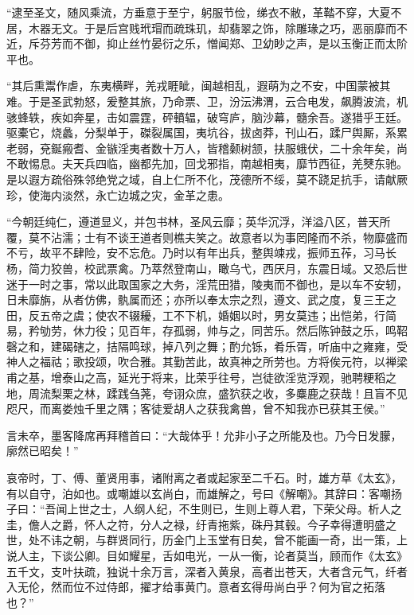 \documentclass[12pt,UTF8]{ctexbook}
\begin{document}
“逮至圣文，随风乘流，方垂意于至宁，躬服节俭，绨衣不敝，革鞜不穿，大夏不居，木器无文。于是后宫贱玳瑁而疏珠玑，却翡翠之饰，除雕瑑之巧，恶丽靡而不近，斥芬芳而不御，抑止丝竹晏衍之乐，憎闻郑、卫幼眇之声，是以玉衡正而太阶平也。



“其后熏鬻作虐，东夷横畔，羌戎睚眦，闽越相乱，遐萌为之不安，中国蒙被其难。于是圣武勃怒，爰整其旅，乃命票、卫，汾沄沸渭，云合电发，飙腾波流，机骇蜂轶，疾如奔星，击如震霆，砰轒辒，破穹庐，脑沙幕，髓余吾。遂猎乎王廷。驱橐它，烧蠡，分梨单于，磔裂属国，夷坑谷，拔卤莽，刊山石，蹂尸舆厮，系累老弱，兗鋋瘢耆、金镞淫夷者数十万人，皆稽颡树颔，扶服蛾伏，二十余年矣，尚不敢惕息。夫天兵四临，幽都先加，回戈邪指，南越相夷，靡节西征，羌僰东驰。是以遐方疏俗殊邻绝党之域，自上仁所不化，茂德所不绥，莫不跷足抗手，请献厥珍，使海内淡然，永亡边城之灾，金革之患。



“今朝廷纯仁，遵道显义，并包书林，圣风云靡；英华沉浮，洋溢八区，普天所覆，莫不沾濡；士有不谈王道者则樵夫笑之。故意者以为事罔隆而不杀，物靡盛而不亏，故平不肆险，安不忘危。乃时以有年出兵，整舆竦戎，振师五莋，习马长杨，简力狡兽，校武票禽。乃萃然登南山，瞰乌弋，西厌月，东震日域。又恐后世迷于一时之事，常以此取国家之大务，淫荒田猎，陵夷而不御也，是以车不安轫，日未靡旃，从者仿佛，骫属而还；亦所以奉太宗之烈，遵文、武之度，复三王之田，反五帝之虞；使农不辍耰，工不下机，婚姻以时，男女莫违；出恺弟，行简易，矜劬劳，休力役；见百年，存孤弱，帅与之，同苦乐。然后陈钟鼓之乐，鸣鞀磬之和，建碣磍之，拮隔鸣球，掉八列之舞；酌允铄，肴乐胥，听庙中之雍雍，受神人之福祜；歌投颂，吹合雅。其勤苦此，故真神之所劳也。方将俟元符，以禅梁甫之基，增泰山之高，延光于将来，比荣乎往号，岂徒欲淫览浮观，驰聘粳稻之地，周流梨栗之林，蹂践刍荛，夸诩众庶，盛狖获之收，多麋鹿之获哉！且盲不见咫尺，而离娄烛千里之隅；客徒爱胡人之获我禽兽，曾不知我亦已获其王侯。”



言未卒，墨客降席再拜稽首曰：“大哉体乎！允非小子之所能及也。乃今日发朦，廓然已昭矣！”



哀帝时，丁、傅、董贤用事，诸附离之者或起家至二千石。时，雄方草《太玄》，有以自守，泊如也。或嘲雄以玄尚白，而雄解之，号曰《解嘲》。其辞曰：客嘲扬子曰：“吾闻上世之士，人纲人纪，不生则已，生则上尊人君，下荣父母。析人之圭，儋人之爵，怀人之符，分人之禄，纡青拖紫，硃丹其毂。今子幸得遭明盛之世，处不讳之朝，与群贤同行，历金门上玉堂有日矣，曾不能画一奇，出一策，上说人主，下谈公卿。目如耀星，舌如电光，一从一衡，论者莫当，顾而作《太玄》五千文，支叶扶疏，独说十余万言，深者入黄泉，高者出苍天，大者含元气，纤者入无伦，然而位不过侍郎，擢才给事黄门。意者玄得毋尚白乎？何为官之拓落也？”
\end{document}
